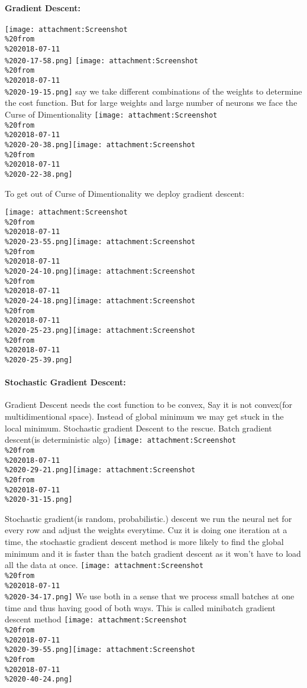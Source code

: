 \documentclass[11pt]{article}
\makeatletter
\def\maxwidth{\ifdim\Gin@nat@width>\linewidth\linewidth
    \else\Gin@nat@width\fi}
\let\Oldincludegraphics\includegraphics
\renewcommand{\includegraphics}[1]{\Oldincludegraphics[width=.8\maxwidth]{#1}}
\makeatother
\begin{document}
\hypertarget{gradient-descent}{%
\paragraph{Gradient Descent:}\label{gradient-descent}}

\texttt{[image: attachment:Screenshot\\\%20from\\\%202018-07-11\\\%2020-17-58.png]}
\texttt{[image: attachment:Screenshot\\\%20from\\\%202018-07-11\\\%2020-19-15.png]}
say we take different combinations of the weights to determine the cost
function. But for large weights and large number of neurons we face the
Curse of Dimentionality
\texttt{[image: attachment:Screenshot\\\%20from\\\%202018-07-11\\\%2020-20-38.png]}\texttt{[image: attachment:Screenshot\\\%20from\\\%202018-07-11\\\%2020-22-38.png]}

To get out of Curse of Dimentionality we deploy gradient descent:

\texttt{[image: attachment:Screenshot\\\%20from\\\%202018-07-11\\\%2020-23-55.png]}\texttt{[image: attachment:Screenshot\\\%20from\\\%202018-07-11\\\%2020-24-10.png]}\texttt{[image: attachment:Screenshot\\\%20from\\\%202018-07-11\\\%2020-24-18.png]}\texttt{[image: attachment:Screenshot\\\%20from\\\%202018-07-11\\\%2020-25-23.png]}\texttt{[image: attachment:Screenshot\\\%20from\\\%202018-07-11\\\%2020-25-39.png]}

\hypertarget{stochastic-gradient-descent}{%
\paragraph{Stochastic Gradient
Descent:}\label{stochastic-gradient-descent}}

Gradient Descent needs the cost function to be convex, Say it is not
convex(for multidimentional space). Instead of global minimum we may get
stuck in the local minimum. Stochastic gradient Descent to the rescue.
Batch gradient descent(is deterministic algo)
\texttt{[image: attachment:Screenshot\\\%20from\\\%202018-07-11\\\%2020-29-21.png]}\texttt{[image: attachment:Screenshot\\\%20from\\\%202018-07-11\\\%2020-31-15.png]}

Stochastic gradient(is random, probabilistic.) descent we run the neural
net for every row and adjust the weights everytime. Cuz it is doing one
iteration at a time, the stochastic gradient descent method is more
likely to find the global minimum and it is faster than the batch
gradient descent as it won't have to load all the data at once.
\texttt{[image: attachment:Screenshot\\\%20from\\\%202018-07-11\\\%2020-34-17.png]}
We use both in a sense that we process small batches at one time and
thus having good of both ways. This is called minibatch gradient descent
method
\texttt{[image: attachment:Screenshot\\\%20from\\\%202018-07-11\\\%2020-39-55.png]}\texttt{[image: attachment:Screenshot\\\%20from\\\%202018-07-11\\\%2020-40-24.png]}
\end{document}
